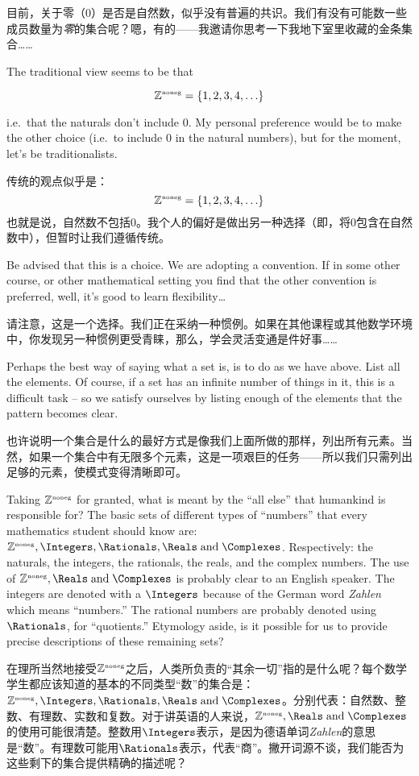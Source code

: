 目前，关于零（$0$）是否是自然数，似乎没有普遍的共识。我们有没有可能数一些成员数量为\emph{零}的集合呢？嗯，有的——我邀请你思考一下我地下室里收藏的金条集合……

The traditional view seems to be that 

\[ {\mathbb Z}^{\mbox{\tiny noneg}} = \{1, 2, 3, 4, \ldots \} \]

\noindent i.e.\ that the naturals don't include 0.  My personal 
preference would be to make the other choice (i.e.\ to include $0$
in the natural numbers), but for the moment, let's be traditionalists.

传统的观点似乎是：
\[ {\mathbb Z}^{\mbox{\tiny noneg}} = \{1, 2, 3, 4, \ldots \} \]
\noindent 也就是说，自然数不包括0。我个人的偏好是做出另一种选择（即，将$0$包含在自然数中），但暂时让我们遵循传统。

\noindent Be advised that this is a choice.  We are adopting a 
convention. If in some other course, or other mathematical setting 
you find that the other convention is preferred, well, it's good to
learn flexibility\ldots

\noindent 请注意，这是一个选择。我们正在采纳一种惯例。如果在其他课程或其他数学环境中，你发现另一种惯例更受青睐，那么，学会灵活变通是件好事……

Perhaps the best way of saying what a set is, is to do as we 
have above. List all the elements.  Of course, if a set has an
infinite number of things in it, this is a difficult task -- so
we satisfy ourselves by listing enough of the elements that the
pattern becomes clear.

也许说明一个集合是什么的最好方式是像我们上面所做的那样，列出所有元素。当然，如果一个集合中有无限多个元素，这是一项艰巨的任务——所以我们只需列出足够的元素，使模式变得清晰即可。

Taking ${\mathbb Z}^{\mbox{\tiny noneg}}$ for granted, what is meant by the ``all else''
that humankind is responsible for? The basic sets of different types
of ``numbers'' that every mathematics student should know are: $\Naturals,
\Integers, \Rationals, \Reals
\; \mbox{and} \; \Complexes$. Respectively: the naturals, the integers, the
rationals, the reals, and the complex numbers.  The use of $\Naturals,
\Reals \; \mbox{and} \;
\Complexes$ is probably clear to an English
speaker.  The integers are denoted with a $\Integers$ because of the
German word {\em Zahlen} which means ``numbers.''   The rational numbers are
probably denoted using $\Rationals$, for ``quotients.''  Etymology
aside, is it possible for us to provide precise descriptions of these
remaining sets?

在理所当然地接受${\mathbb Z}^{\mbox{\tiny noneg}}$之后，人类所负责的“其余一切”指的是什么呢？每个数学学生都应该知道的基本的不同类型“数”的集合是：$\Naturals, \Integers, \Rationals, \Reals\; \mbox{and} \; \Complexes$。分别代表：自然数、整数、有理数、实数和复数。对于讲英语的人来说，$\Naturals, \Reals \; \mbox{and} \; \Complexes$的使用可能很清楚。整数用$\Integers$表示，是因为德语单词{\em Zahlen}的意思是“数”。有理数可能用$\Rationals$表示，代表“商”。撇开词源不谈，我们能否为这些剩下的集合提供精确的描述呢？

